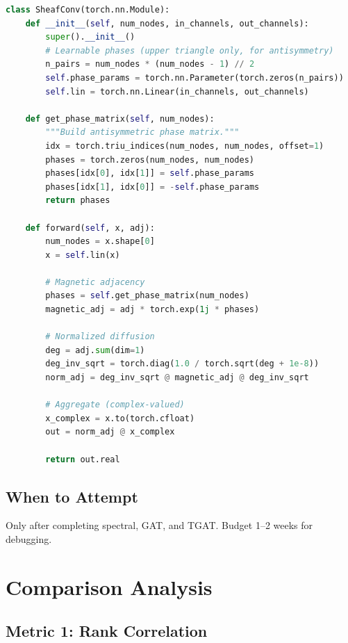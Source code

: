 \documentclass[11pt, a4paper]{article}
\begin{document}
\begin{lstlisting}[language=Python]
class SheafConv(torch.nn.Module):
    def __init__(self, num_nodes, in_channels, out_channels):
        super().__init__()
        # Learnable phases (upper triangle only, for antisymmetry)
        n_pairs = num_nodes * (num_nodes - 1) // 2
        self.phase_params = torch.nn.Parameter(torch.zeros(n_pairs))
        self.lin = torch.nn.Linear(in_channels, out_channels)
    
    def get_phase_matrix(self, num_nodes):
        """Build antisymmetric phase matrix."""
        idx = torch.triu_indices(num_nodes, num_nodes, offset=1)
        phases = torch.zeros(num_nodes, num_nodes)
        phases[idx[0], idx[1]] = self.phase_params
        phases[idx[1], idx[0]] = -self.phase_params
        return phases
    
    def forward(self, x, adj):
        num_nodes = x.shape[0]
        x = self.lin(x)
        
        # Magnetic adjacency
        phases = self.get_phase_matrix(num_nodes)
        magnetic_adj = adj * torch.exp(1j * phases)
        
        # Normalized diffusion
        deg = adj.sum(dim=1)
        deg_inv_sqrt = torch.diag(1.0 / torch.sqrt(deg + 1e-8))
        norm_adj = deg_inv_sqrt @ magnetic_adj @ deg_inv_sqrt
        
        # Aggregate (complex-valued)
        x_complex = x.to(torch.cfloat)
        out = norm_adj @ x_complex
        
        return out.real
\end{lstlisting}

\subsection{When to Attempt}

Only after completing spectral, GAT, and TGAT. Budget 1--2 weeks for debugging.

\section{Comparison Analysis}

\subsection{Metric 1: Rank Correlation}
\end{document}
